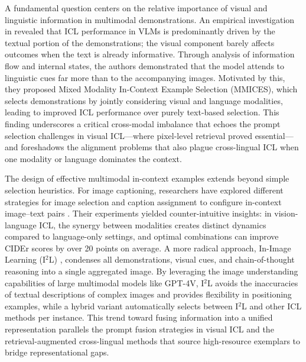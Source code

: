 \documentclass[11pt]{article}
\begin{document}
A fundamental question centers on the relative importance of visual and linguistic information in multimodal demonstrations. An empirical investigation in \cite{ref116} revealed that ICL performance in VLMs is predominantly driven by the textual portion of the demonstrations; the visual component barely affects outcomes when the text is already informative. Through analysis of information flow and internal states, the authors demonstrated that the model attends to linguistic cues far more than to the accompanying images. Motivated by this, they proposed Mixed Modality In-Context Example Selection (MMICES), which selects demonstrations by jointly considering visual and language modalities, leading to improved ICL performance over purely text-based selection. This finding underscores a critical cross-modal imbalance that echoes the prompt selection challenges in visual ICL---where pixel-level retrieval proved essential---and foreshadows the alignment problems that also plague cross-lingual ICL when one modality or language dominates the context.

The design of effective multimodal in-context examples extends beyond simple selection heuristics. For image captioning, researchers have explored different strategies for image selection and caption assignment to configure in-context image--text pairs \cite{ref117}. Their experiments yielded counter-intuitive insights: in vision-language ICL, the synergy between modalities creates distinct dynamics compared to language-only settings, and optimal combinations can improve CIDEr scores by over 20 points on average. A more radical approach, In-Image Learning (I\(^2\)L) \cite{ref118}, condenses all demonstrations, visual cues, and chain-of-thought reasoning into a single aggregated image. By leveraging the image understanding capabilities of large multimodal models like GPT-4V, I\(^2\)L avoids the inaccuracies of textual descriptions of complex images and provides flexibility in positioning examples, while a hybrid variant automatically selects between I\(^2\)L and other ICL methods per instance. This trend toward fusing information into a unified representation parallels the prompt fusion strategies in visual ICL and the retrieval-augmented cross-lingual methods that source high-resource exemplars to bridge representational gaps.
\end{document}
